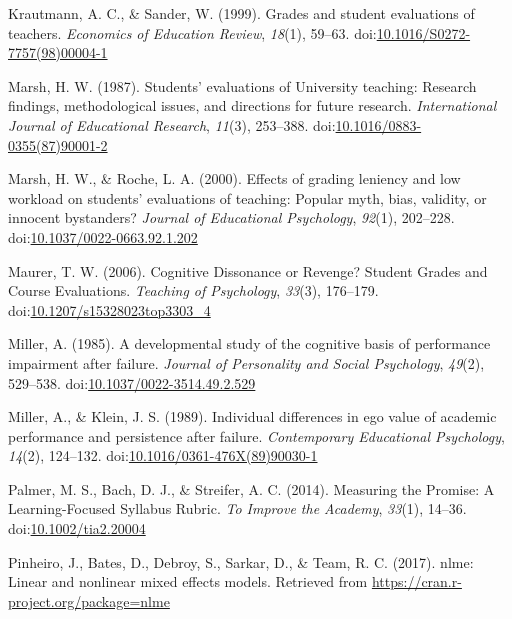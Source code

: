 \documentclass[,man]{apa6}
\theoremstyle{definition}
\theoremstyle{definition}
\theoremstyle{definition}
\theoremstyle{remark}
\begin{document}
\leavevmode\hypertarget{ref-Krautmann1999}{}%
Krautmann, A. C., \& Sander, W. (1999). Grades and student evaluations
of teachers. \emph{Economics of Education Review}, \emph{18}(1), 59--63.
doi:\href{https://doi.org/10.1016/S0272-7757(98)00004-1}{10.1016/S0272-7757(98)00004-1}

\leavevmode\hypertarget{ref-Marsh1987}{}%
Marsh, H. W. (1987). Students' evaluations of University teaching:
Research findings, methodological issues, and directions for future
research. \emph{International Journal of Educational Research},
\emph{11}(3), 253--388.
doi:\href{https://doi.org/10.1016/0883-0355(87)90001-2}{10.1016/0883-0355(87)90001-2}

\leavevmode\hypertarget{ref-Marsh2000}{}%
Marsh, H. W., \& Roche, L. A. (2000). Effects of grading leniency and
low workload on students' evaluations of teaching: Popular myth, bias,
validity, or innocent bystanders? \emph{Journal of Educational
Psychology}, \emph{92}(1), 202--228.
doi:\href{https://doi.org/10.1037/0022-0663.92.1.202}{10.1037/0022-0663.92.1.202}

\leavevmode\hypertarget{ref-Maurer2006}{}%
Maurer, T. W. (2006). Cognitive Dissonance or Revenge? Student Grades
and Course Evaluations. \emph{Teaching of Psychology}, \emph{33}(3),
176--179.
doi:\href{https://doi.org/10.1207/s15328023top3303_4}{10.1207/s15328023top3303\_4}

\leavevmode\hypertarget{ref-Miller1985}{}%
Miller, A. (1985). A developmental study of the cognitive basis of
performance impairment after failure. \emph{Journal of Personality and
Social Psychology}, \emph{49}(2), 529--538.
doi:\href{https://doi.org/10.1037/0022-3514.49.2.529}{10.1037/0022-3514.49.2.529}

\leavevmode\hypertarget{ref-Miller1989}{}%
Miller, A., \& Klein, J. S. (1989). Individual differences in ego value
of academic performance and persistence after failure.
\emph{Contemporary Educational Psychology}, \emph{14}(2), 124--132.
doi:\href{https://doi.org/10.1016/0361-476X(89)90030-1}{10.1016/0361-476X(89)90030-1}

\leavevmode\hypertarget{ref-Palmer2014}{}%
Palmer, M. S., Bach, D. J., \& Streifer, A. C. (2014). Measuring the
Promise: A Learning-Focused Syllabus Rubric. \emph{To Improve the
Academy}, \emph{33}(1), 14--36.
doi:\href{https://doi.org/10.1002/tia2.20004}{10.1002/tia2.20004}

\leavevmode\hypertarget{ref-Pinheiro2017}{}%
Pinheiro, J., Bates, D., Debroy, S., Sarkar, D., \& Team, R. C. (2017).
nlme: Linear and nonlinear mixed effects models. Retrieved from
\url{https://cran.r-project.org/package=nlme}
\end{document}
